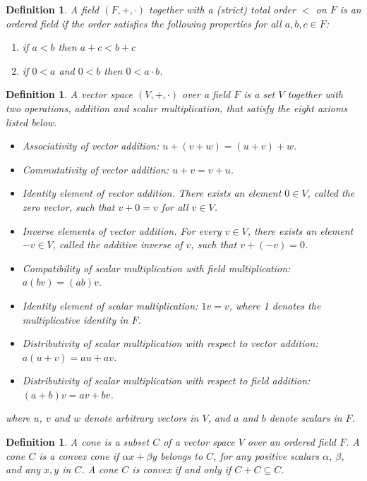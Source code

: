 \documentclass{article}
\theoremstyle{mytheorem}
\newtheorem{definition}[theorem]{Definition}
\begin{document}
\begin{definition}
A field $(F, +, \cdot)$ together with a (strict) total order $<$ on $F$ is an \emph{ordered field} if the order satisfies the following properties for all $a, b, c \in F$:
  \begin{enumerate}
      \item if $a < b$ then $a + c < b + c$
      \item if $0 < a$ and $0 < b$ then $0 < a \cdot b$.
  \end{enumerate}
\end{definition}

\begin{definition}
A \emph{vector space} $(V, +, \cdot)$ over a field $F$ is a set $V$ together with two operations, addition and scalar multiplication, that satisfy the eight axioms listed below.
  \begin{itemize}
    \item Associativity of vector addition: $u + (v + w) = (u + v) + w$.
    \item Commutativity of vector addition: $u + v = v + u$.
    \item Identity element of vector addition. There exists an element $0 \in V$, called the zero vector, such that $v + 0 = v$ for all $v \in V$.
    \item Inverse elements of vector addition. For every $v \in V$, there exists an element $-v \in V$, called the additive inverse of $v$, such that $v + (-v) = 0$.
    \item Compatibility of scalar multiplication with field multiplication: $a(bv) = (ab)v$.
    \item Identity element of scalar multiplication: $1v = v$, where 1 denotes the multiplicative identity in $F$.
    \item Distributivity of scalar multiplication with respect to vector addition: $a(u + v) = au + av$.
    \item Distributivity of scalar multiplication with respect to field addition: $(a + b)v = av + bv$.
  \end{itemize}
   where $u$, $v$ and $w$ denote arbitrary vectors in $V$, and $a$ and $b$ denote scalars in $F$.
\end{definition}

\begin{definition}
A \emph{cone} is a subset $C$ of a vector space $V$ over an ordered field $F$. A cone $C$ is a convex cone if $\alpha x + \beta y$ belongs to $C$, for any positive scalars $\alpha$, $\beta$, and any $x, y$ in $C$. A cone $C$ is convex if and only if $C + C \subseteq C$. 
\end{definition}
\end{document}
